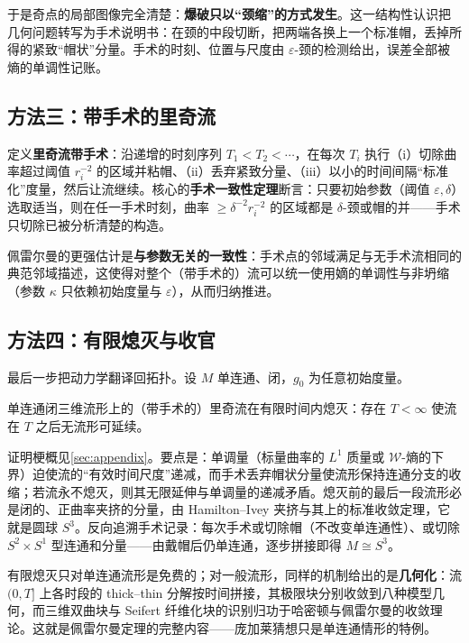 于是奇点的局部图像完全清楚：\textbf{爆破只以“颈缩”的方式发生}。这一结构性认识把几何问题转写为手术说明书：在颈的中段切断，把两端各换上一个标准帽，丢掉所得的紧致“帽状”分量。手术的时刻、位置与尺度由 $\varepsilon$-颈的检测给出，误差全部被熵的单调性记账。

\subsection{方法三：带手术的里奇流}

定义\textbf{里奇流带手术}：沿递增的时刻序列 $T_1 < T_2 < \cdots$，在每次 $T_i$ 执行（i）切除曲率超过阈值 $r_i^{-2}$ 的区域并粘帽、（ii）丢弃紧致分量、（iii）以小的时间间隔“标准化”度量，然后让流继续。核心的\textbf{手术一致性定理}断言：只要初始参数（阈值 $\varepsilon, \delta$）选取适当，则在任一手术时刻，曲率 $\geq \delta^{-2} r_i^{-2}$ 的区域都是 $\delta$-颈或帽的并——手术只切除已被分析清楚的构造。

佩雷尔曼的更强估计是\textbf{与参数无关的一致性}：手术点的邻域满足与无手术流相同的典范邻域描述，这使得对整个（带手术的）流可以统一使用嫡的单调性与非坍缩（参数 $\kappa$ 只依赖初始度量与 $\varepsilon$），从而归纳推进。

\subsection{方法四：有限熄灭与收官}

最后一步把动力学翻译回拓扑。设 $M$ 单连通、闭，$g_0$ 为任意初始度量。

\begin{theorem}[有限熄灭]\label{thm:extinction}
    单连通闭三维流形上的（带手术的）里奇流在有限时间内熄灭：存在 $T < \infty$ 使流在 $T$ 之后无流形可延续。
\end{theorem}

证明梗概见\cref{sec:appendix}。要点是：单调量（标量曲率的 $L^1$ 质量或 $\mathcal{W}$-熵的下界）迫使流的“有效时间尺度”递减，而手术丢弃帽状分量使流形保持连通分支的收缩；若流永不熄灭，则其无限延伸与单调量的递减矛盾。熄灭前的最后一段流形必是闭的、正曲率夹挤的分量，由 Hamilton--Ivey 夹挤与其上的标准收敛定理，它就是圆球 $S^3$。反向追溯手术记录：每次手术或切除帽（不改变单连通性）、或切除 $S^2 \times S^1$ 型连通和分量——由戴帽后仍单连通，逐步拼接即得 $M \cong S^3$。

\begin{remark}
    有限熄灭只对单连通流形是免费的；对一般流形，同样的机制给出的是\textbf{几何化}：流 $(0, T]$ 上各时段的 thick--thin 分解按时间拼接，其极限块分别收敛到八种模型几何，而三维双曲块与 Seifert 纤维化块的识别归功于哈密顿与佩雷尔曼的收敛理论。这就是佩雷尔曼定理的完整内容——庞加莱猜想只是单连通情形的特例。
\end{remark}
